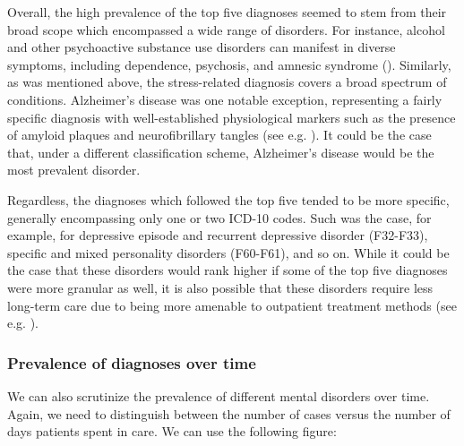 \documentclass[
]{book}
\theoremstyle{definition}
\theoremstyle{definition}
\theoremstyle{definition}
\theoremstyle{definition}
\theoremstyle{remark}
\begin{document}
Overall, the high prevalence of the top five diagnoses seemed to stem from their broad scope which encompassed a wide range of disorders. For instance, alcohol and other psychoactive substance use disorders can manifest in diverse symptoms, including dependence, psychosis, and amnesic syndrome (). Similarly, as was mentioned above, the stress-related diagnosis covers a broad spectrum of conditions. Alzheimer's disease was one notable exception, representing a fairly specific diagnosis with well-established physiological markers such as the presence of amyloid plaques and neurofibrillary tangles (see e.g. ). It could be the case that, under a different classification scheme, Alzheimer's disease would be the most prevalent disorder.

Regardless, the diagnoses which followed the top five tended to be more specific, generally encompassing only one or two ICD-10 codes. Such was the case, for example, for depressive episode and recurrent depressive disorder (F32-F33), specific and mixed personality disorders (F60-F61), and so on. While it could be the case that these disorders would rank higher if some of the top five diagnoses were more granular as well, it is also possible that these disorders require less long-term care due to being more amenable to outpatient treatment methods (see e.g. ).

\subsubsection{Prevalence of diagnoses over time}\label{prevalence-of-diagnoses-over-time}

We can also scrutinize the prevalence of different mental disorders over time. Again, we need to distinguish between the number of cases versus the number of days patients spent in care. We can use the following figure:
\end{document}
